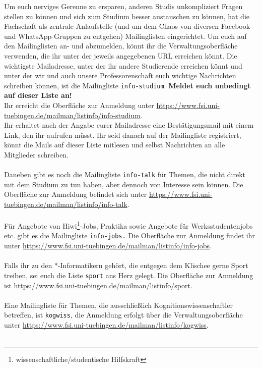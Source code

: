 Um euch nerviges Gerenne zu ersparen, anderen Studis unkompliziert Fragen stellen zu können und
sich zum Studium besser austauschen zu können, hat die Fachschaft als zentrale Anlaufstelle (und um dem Chaos von diversen Facebook- und WhatsApp-Gruppen zu entgehen) Mailinglisten eingerichtet. 
Um euch auf den Mailinglisten an- und abzumelden, könnt ihr die Verwaltungsoberfläche verwenden, die ihr unter der jeweils angegebenen URL erreichen könnt.
Die wichtigste Mailadresse, unter der ihr andere Studierende erreichen könnt und unter der wir und auch unsere Professorenschaft euch wichtige Nachrichten schreiben können, ist die Mailingliste \texttt{info-studium}. \textbf{Meldet euch unbedingt auf dieser Liste an!}\\
Ihr erreicht die Oberfläche zur Anmeldung unter \url{https://www.fsi.uni-tuebingen.de/mailman/listinfo/info-studium}. \\
Ihr erhaltet nach der Angabe eurer Mailadresse eine Bestätigungsmail mit einem Link, den ihr aufrufen müsst. Ihr seid danach auf der Mailingliste registriert, könnt die Mails auf dieser Liste mitlesen und selbst Nachrichten an alle Mitglieder schreiben. \\\\
Daneben gibt es noch die Mailingliste \texttt{info-talk} für Themen, die nicht direkt mit dem Studium
zu tun haben, aber dennoch von Interesse sein können. Die Oberfläche zur Anmeldung befindet sich unter \url{https://www.fsi.uni-tuebingen.de/mailman/listinfo/info-talk}. \\\\
Für Angebote von Hiwi\footnote{wissenschaftliche/studentische Hilfskraft}-Jobs, Praktika sowie Angebote für Werksstudentenjobs etc. gibt es die Mailingliste \texttt{info-jobs.} Die Oberfläche zur Anmeldung findet ihr unter \url{https://www.fsi.uni-tuebingen.de/mailman/listinfo/info-jobs}.\\\\
Falls ihr zu den *-Informatikern gehört, die entgegen dem Klischee gerne Sport treiben, sei euch die Liste \texttt{sport} ans Herz gelegt. Die Oberfläche zur Anmeldung ist \url{https://www.fsi.uni-tuebingen.de/mailman/listinfo/sport}. \\\\
\ifkogwiss 
Eine Mailingliste für Themen, die ausschließlich Kognitionswissenschaftler betreffen, ist
\texttt{kogwiss}, die Anmeldung erfolgt über die Verwaltungsoberfläche unter \url{https://www.fsi.uni-tuebingen.de/mailman/listinfo/kogwiss}. \\\\

